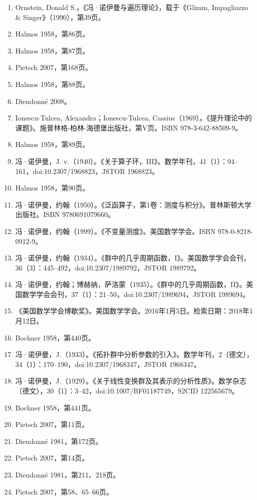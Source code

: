 \begin{enumerate}
\item Ornstein, Donald S.，《冯·诺伊曼与遍历理论》，载于《Glimm, Impagliazzo & Singer》（1990），第39页。  
\item Halmos 1958，第86页。  
\item Halmos 1958，第87页。  
\item Pietsch 2007，第168页。  
\item Halmos 1958，第88页。  
\item Dieudonné 2008。  
\item Ionescu-Tulcea, Alexandra；Ionescu-Tulcea, Cassius（1969）。《提升理论中的课题》。施普林格-柏林-海德堡出版社，第V页。ISBN 978-3-642-88509-9。  
\item Halmos 1958，第89页。  
\item 冯·诺伊曼，J. v.（1940）。《关于算子环，III》。数学年刊，41（1）：94–161，doi:10.2307/1968823，JSTOR 1968823。  
\item Halmos 1958，第90页。  
\item 冯·诺伊曼，约翰（1950）。《泛函算子，第1卷：测度与积分》。普林斯顿大学出版社。ISBN 9780691079660。  
\item 冯·诺伊曼，约翰（1999）。《不变量测度》。美国数学学会。ISBN 978-0-8218-0912-9。  
\item 冯·诺伊曼，约翰（1934）。《群中的几乎周期函数，I》。美国数学学会会刊，36（3）：445–492，doi:10.2307/1989792，JSTOR 1989792。  
\item 冯·诺伊曼，约翰；博赫纳，萨洛蒙（1935）。《群中的几乎周期函数，II》。美国数学学会会刊，37（1）：21–50，doi:10.2307/1989694，JSTOR 1989694。  
\item 《美国数学学会博歇奖》。美国数学学会。2016年1月5日。检索日期：2018年1月12日。  
\item Bochner 1958，第440页。
\item 冯·诺伊曼，J.（1933）。《拓扑群中分析参数的引入》。数学年刊，2（德文），34（1）：170–190，doi:10.2307/1968347，JSTOR 1968347。  
\item 冯·诺伊曼，J.（1929）。《关于线性变换群及其表示的分析性质》。数学杂志（德文），30（1）：3–42，doi:10.1007/BF01187749，S2CID 122565679。  
\item Bochner 1958，第441页。  
\item Pietsch 2007，第11页。  
\item Dieudonné 1981，第172页。  
\item Pietsch 2007，第14页。  
\item Dieudonné 1981，第211、218页。  
\item Pietsch 2007，第58、65–66页。  

\end{enumerate}
